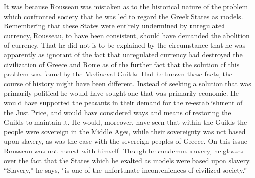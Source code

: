 \documentclass{book}
\begin{document}
It was because Rousseau was mistaken as to the historical nature of the problem which confronted society that he was led to regard the Greek States as models. Remembering that these States were entirely undermined by unregulated currency, Rousseau, to have been consistent, should have demanded the abolition of currency. That he did not is to be explained by the circumstance that he was apparently as ignorant of the fact that unregulated currency had destroyed the civilization of Greece and Rome as of the further fact that the solution of this problem was found by the Mediaeval Guilds. Had he known these facts, the course of history might have been different. Instead of seeking a solution that was primarily political he would have sought one that was primarily economic. He would have supported the peasants in their demand for the re-establishment of the Just Price, and would have considered ways and means of restoring the Guilds to maintain it. He would, moreover, have seen that within the Guilds the people were sovereign in the Middle Ages, while their sovereignty was not based upon slavery, as was the case with the sovereign peoples of Greece. On this issue Rousseau was not honest with himself. Though he condemns slavery, he glosses over the fact that the States which he exalted as models were based upon slavery. “Slavery,” he says, “is one of the unfortunate inconveniences of civilized society.”
\end{document}
